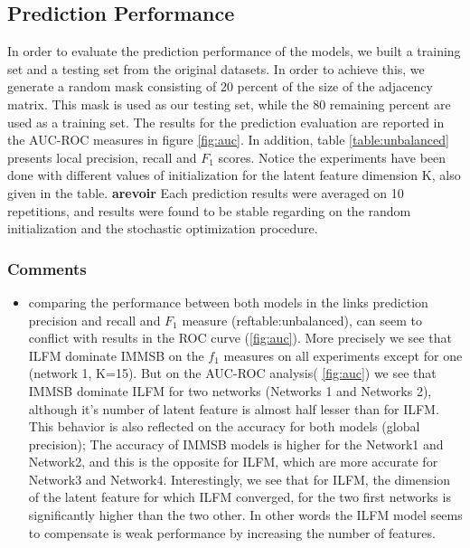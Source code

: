 \documentclass[a4paper, 12pt]{article}
\begin{document}
\subsection{Prediction Performance}
In order to evaluate the  prediction performance of the models, we built a training set and a testing set from the original datasets. In order to achieve this, we generate a random mask consisting of 20 percent of the size of the adjacency matrix. This mask is used as our testing set, while the 80 remaining percent are used as a training set. The results for the prediction evaluation are reported in  the AUC-ROC measures in figure \ref{fig:auc}. In addition,  table \ref{table:unbalanced} presents local precision, recall and $F_1$ scores.   Notice the experiments have been done with different  values of initialization for the latent feature dimension K, also given in the table.
\textbf{arevoir}
Each prediction results were averaged on 10 repetitions, and results were found to be stable regarding on the random  initialization and the stochastic optimization procedure. 





\subsubsection{Comments}

\begin{itemize}
\item comparing the performance between both models in the links prediction precision and recall and $F_1$ measure (ref{table:unbalanced}), can seem to conflict with results in the ROC curve (\ref{fig:auc}). More precisely we see that ILFM dominate IMMSB on the $f_1$ measures on all experiments except for one (network 1, K=15). But on the AUC-ROC analysis( \ref{fig:auc}) we see that IMMSB dominate ILFM for two networks (Networks 1 and Networks 2), although it's number of latent feature is almost half lesser than for ILFM. This behavior is also reflected on the accuracy for both models (global precision); The accuracy of IMMSB models is higher for the Network1 and Network2, and this is the opposite for ILFM, which are more accurate for Network3 and Network4. Interestingly, we see that for ILFM, the dimension of the latent feature for which ILFM converged, for the two first networks is significantly higher than the two other. In other words the ILFM model seems to compensate is weak performance by increasing the number of features.
 
\end{itemize}





\end{document}

